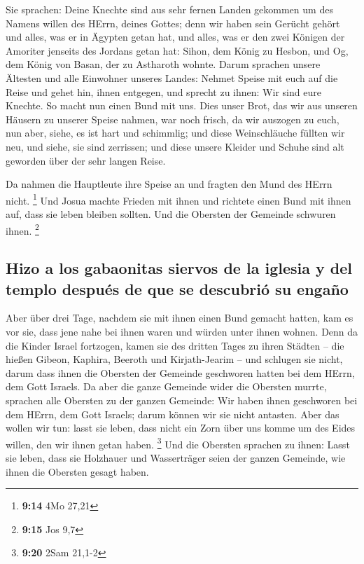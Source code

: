  Sie sprachen: Deine Knechte sind aus sehr fernen Landen
gekommen um des Namens willen des HErrn, deines Gottes; denn wir haben
sein Gerücht gehört und alles, was er in Ägypten getan hat,
 und alles, was er den zwei Königen der Amoriter jenseits
des Jordans getan hat: Sihon, dem König zu Hesbon, und Og, dem König von
Basan, der zu Astharoth wohnte.  Darum sprachen unsere
Ältesten und alle Einwohner unseres Landes: Nehmet Speise mit euch auf
die Reise und gehet hin, ihnen entgegen, und sprecht zu ihnen: Wir sind
eure Knechte. So macht nun einen Bund mit uns.  Dies
unser Brot, das wir aus unseren Häusern zu unserer Speise nahmen, war
noch frisch, da wir auszogen zu euch, nun aber, siehe, es ist hart und
schimmlig;  und diese Weinschläuche füllten wir neu, und
siehe, sie sind zerrissen; und diese unsere Kleider und Schuhe sind alt
geworden über der sehr langen Reise.

 Da nahmen die Hauptleute ihre Speise an und fragten den
Mund des HErrn nicht. \footnote{\textbf{9:14} 4Mo 27,21} 
Und Josua machte Frieden mit ihnen und richtete einen Bund mit ihnen
auf, dass sie leben bleiben sollten. Und die Obersten der Gemeinde
schwuren ihnen. \footnote{\textbf{9:15} Jos 9,7}

\hypertarget{hizo-a-los-gabaonitas-siervos-de-la-iglesia-y-del-templo-despuuxe9s-de-que-se-descubriuxf3-su-engauxf1o}{%
\subsection{Hizo a los gabaonitas siervos de la iglesia y del templo
después de que se descubrió su
engaño}\label{hizo-a-los-gabaonitas-siervos-de-la-iglesia-y-del-templo-despuuxe9s-de-que-se-descubriuxf3-su-engauxf1o}}

 Aber über drei Tage, nachdem sie mit ihnen einen Bund
gemacht hatten, kam es vor sie, dass jene nahe bei ihnen waren und
würden unter ihnen wohnen.  Denn da die Kinder Israel
fortzogen, kamen sie des dritten Tages zu ihren Städten -- die hießen
Gibeon, Kaphira, Beeroth und Kirjath-Jearim --  und
schlugen sie nicht, darum dass ihnen die Obersten der Gemeinde
geschworen hatten bei dem HErrn, dem Gott Israels. Da aber die ganze
Gemeinde wider die Obersten murrte,  sprachen alle
Obersten zu der ganzen Gemeinde: Wir haben ihnen geschworen bei dem
HErrn, dem Gott Israels; darum können wir sie nicht antasten.
 Aber das wollen wir tun: lasst sie leben, dass nicht ein
Zorn über uns komme um des Eides willen, den wir ihnen getan haben.
\footnote{\textbf{9:20} 2Sam 21,1-2}  Und die Obersten
sprachen zu ihnen: Lasst sie leben, dass sie Holzhauer und Wasserträger
seien der ganzen Gemeinde, wie ihnen die Obersten gesagt haben.

